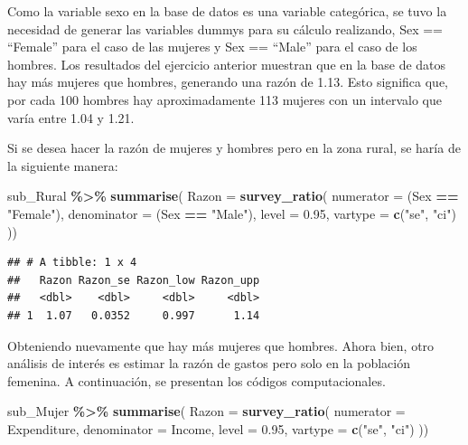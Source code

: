 \documentclass[
  12pt,
]{book}
\newenvironment{Shaded}{\begin{snugshade}}{\end{snugshade}}
\newcommand{\AttributeTok}[1]{\textcolor[rgb]{0.13,0.29,0.53}{#1}}
\newcommand{\FloatTok}[1]{\textcolor[rgb]{0.00,0.00,0.81}{#1}}
\newcommand{\FunctionTok}[1]{\textcolor[rgb]{0.13,0.29,0.53}{\textbf{#1}}}
\newcommand{\NormalTok}[1]{#1}
\newcommand{\SpecialCharTok}[1]{\textcolor[rgb]{0.81,0.36,0.00}{\textbf{#1}}}
\newcommand{\StringTok}[1]{\textcolor[rgb]{0.31,0.60,0.02}{#1}}
\begin{document}
Como la variable sexo en la base de datos es una variable categórica, se tuvo la necesidad de generar las variables dummys para su cálculo realizando, Sex == ``Female'' para el caso de las mujeres y Sex == ``Male'' para el caso de los hombres. Los resultados del ejercicio anterior muestran que en la base de datos hay más mujeres que hombres, generando una razón de 1.13. Esto significa que, por cada 100 hombres hay aproximadamente 113 mujeres con un intervalo que varía entre 1.04 y 1.21.

Si se desea hacer la razón de mujeres y hombres pero en la zona rural, se haría de la siguiente manera:

\begin{Shaded}
\begin{Highlighting}[]
\NormalTok{sub\_Rural }\SpecialCharTok{\%\textgreater{}\%} \FunctionTok{summarise}\NormalTok{(}
    \AttributeTok{Razon =}  \FunctionTok{survey\_ratio}\NormalTok{(}
      \AttributeTok{numerator =}\NormalTok{ (Sex }\SpecialCharTok{==} \StringTok{"Female"}\NormalTok{),}
      \AttributeTok{denominator =}\NormalTok{ (Sex }\SpecialCharTok{==} \StringTok{"Male"}\NormalTok{),}
      \AttributeTok{level =} \FloatTok{0.95}\NormalTok{,}
    \AttributeTok{vartype =}  \FunctionTok{c}\NormalTok{(}\StringTok{"se"}\NormalTok{, }\StringTok{"ci"}\NormalTok{)}
\NormalTok{    ))}
\end{Highlighting}
\end{Shaded}

\begin{verbatim}
## # A tibble: 1 x 4
##   Razon Razon_se Razon_low Razon_upp
##   <dbl>    <dbl>     <dbl>     <dbl>
## 1  1.07   0.0352     0.997      1.14
\end{verbatim}

Obteniendo nuevamente que hay más mujeres que hombres. Ahora bien, otro análisis de interés es estimar la razón de gastos pero solo en la población femenina. A continuación, se presentan los códigos computacionales.

\begin{Shaded}
\begin{Highlighting}[]
\NormalTok{sub\_Mujer }\SpecialCharTok{\%\textgreater{}\%} \FunctionTok{summarise}\NormalTok{(}
    \AttributeTok{Razon =}  \FunctionTok{survey\_ratio}\NormalTok{(}
      \AttributeTok{numerator =}\NormalTok{ Expenditure,}
      \AttributeTok{denominator =}\NormalTok{ Income,}
      \AttributeTok{level =} \FloatTok{0.95}\NormalTok{,}
    \AttributeTok{vartype =}  \FunctionTok{c}\NormalTok{(}\StringTok{"se"}\NormalTok{, }\StringTok{"ci"}\NormalTok{)}
\NormalTok{    ))}
\end{Highlighting}
\end{Shaded}
\end{document}
